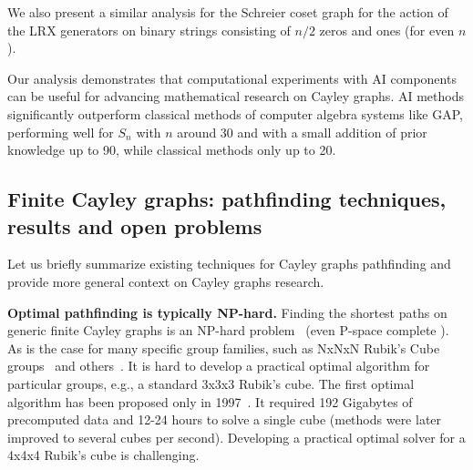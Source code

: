 \documentclass[atmp]{ipart_v1}
\numberwithin{equation}{section}
\theoremstyle{plain}%
\begin{document}
We also present a similar analysis for the Schreier coset graph for the action of the LRX generators on binary strings consisting of $n/2$ zeros and ones (for even $n$). %

Our analysis demonstrates that computational experiments with AI components can be useful for advancing mathematical research on Cayley graphs. AI methods significantly outperform classical methods of computer algebra systems like GAP, performing well for  $S_n$ with $n$ around 30 and with a small addition of prior knowledge up to 90, while classical methods only up to 20. 





\subsection{Finite Cayley graphs: pathfinding techniques, results and open problems}

Let us briefly summarize existing techniques for Cayley graphs pathfinding and provide more general context on Cayley graphs research.


{\bf Optimal pathfinding is typically NP-hard.} Finding the shortest paths on generic finite Cayley graphs is an NP-hard problem~\cite{even1981minimum} (even P-space complete \cite{jerrum1985complexity}). As is the case for many specific group families, such as NxNxN Rubik's Cube groups~\cite{demaine2017solving} and others~\cite{bulteau2015pancake, wilson2024cayley}.
It is hard to develop a practical optimal algorithm for particular groups, e.g., a standard 3x3x3 Rubik's cube. The first optimal algorithm has been proposed only in 1997~\cite{korf1997finding}. It required 192 Gigabytes of precomputed data and 12-24 hours to solve a single cube (methods were later improved\cite{Reid1997Optimal,HKociemba2021,Rokicki2014Diameter,Skalskivcube} to several cubes per second). Developing a practical optimal solver for a 4x4x4 Rubik's cube is challenging. 
\end{document}
